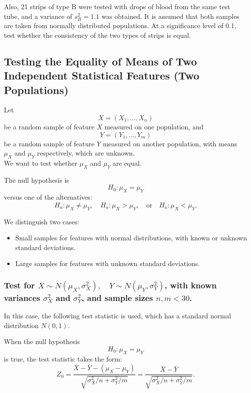\documentclass[a4paper, 12pt]{article}
\begin{document}
Also, 21 strips of type B were tested with drops of blood from the same test tube, and a variance of  $s_B^2 = 1.1$ was obtained. It is assumed that both samples are taken from normally distributed populations. At a significance level of 0.1, test whether the consistency of the two types of strips is equal.


\subsection{Testing the \textbf{Equality of Means} of Two Independent Statistical Features (Two Populations)}  

Let 
\[
X = (X_1, \ldots, X_n)
\] 
be a random sample of feature $X$ measured on one population, and 
\[
Y = (Y_1, \ldots, Y_m)
\] 
be a random sample of feature $Y$ measured on another population, with means $\mu_X$ and $\mu_Y$ respectively, which are unknown. \\ 

We want to test whether $\mu_X$ and $\mu_Y$ are equal.  

The null hypothesis is
\[
H_0: \mu_X = \mu_Y
\] 
versus one of the alternatives:
\[
H_a: \mu_X \neq \mu_Y, \quad H_a: \mu_X > \mu_Y, \quad \text{or} \quad H_a: \mu_X < \mu_Y.
\]  

We distinguish two cases:  
\begin{itemize}
  \item  [1.] Small samples for features with normal distributions, with known or unknown standard deviations.  
  \item [2.] Large samples for features with unknown standard deviations.\\
\end{itemize}


\subsubsection{Test for $X \sim N(\mu_X, \sigma_X^2), \quad Y \sim N(\mu_Y, \sigma_Y^2)$, with known variances $\sigma_X^2$ and $\sigma_Y^2$, and sample sizes $n, m < 30$.  }

In this case, the following test statistic is used, which has a standard normal distribution $N(0,1)$.  

When the null hypothesis 
\[
H_0: \mu_X = \mu_Y
\] 
is true, the test statistic takes the form:
\[
Z_0 = \frac{\bar{X} - \bar{Y} - (\mu_X - \mu_Y)}{\sqrt{\sigma_X^2 / n + \sigma_Y^2 / m}} 
= \frac{\bar{X} - \bar{Y}}{\sqrt{\sigma_X^2 / n + \sigma_Y^2 / m}}.
\]
\end{document}
